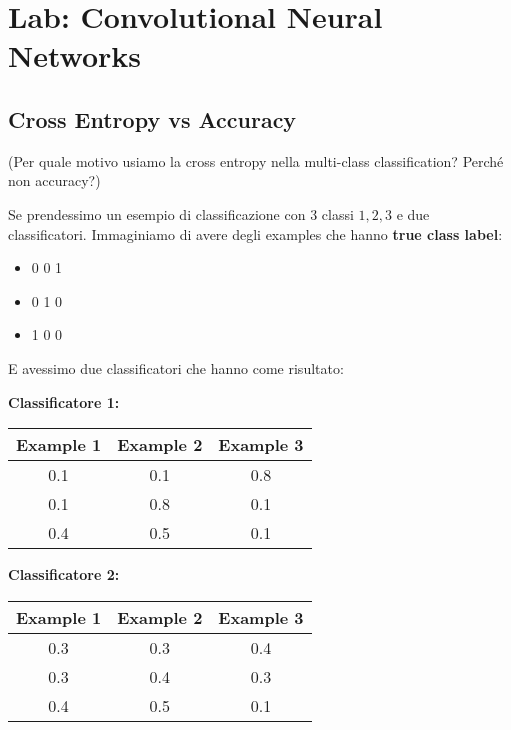 \section{Lab: Convolutional Neural Networks}

\subsection{Cross Entropy vs Accuracy}

\begin{domanda}(Per quale motivo usiamo la cross entropy nella multi-class classification? Perché non accuracy?)
\end{domanda}

Se prendessimo un esempio di classificazione con 3 classi $1,2,3$ e due
classificatori. Immaginiamo di avere degli examples che hanno \textbf{true
    class label}:

\begin{itemize}
    \item 0 0 1
    \item 0 1 0
    \item 1 0 0
\end{itemize}

E avessimo due classificatori che hanno come risultato:

\begin{table}[H]
    \centering
    \textbf{Classificatore 1:}

    \begin{tabular}{|c|c|c|}
        \hline
        \textbf{Example 1} & \textbf{Example 2} & \textbf{Example 3} \\
        \hline
        0.1                & 0.1                & 0.8                \\
        \hline
        0.1                & 0.8                & 0.1                \\
        \hline
        0.4                & 0.5                & 0.1                \\
        \hline
    \end{tabular}
\end{table}

\begin{table}[H]
    \centering
    \textbf{Classificatore 2:}

    \begin{tabular}{|c|c|c|}
        \hline
        \textbf{Example 1} & \textbf{Example 2} & \textbf{Example 3} \\
        \hline
        0.3                & 0.3                & 0.4                \\
        \hline
        0.3                & 0.4                & 0.3                \\
        \hline
        0.4                & 0.5                & 0.1                \\
        \hline
    \end{tabular}
\end{table}


